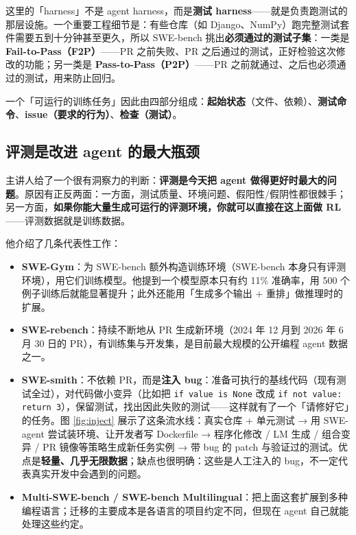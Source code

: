﻿\documentclass[a4paper]{article}
\begin{document}
这里的「harness」不是 agent harness，而是\textbf{测试 harness}——就是负责跑测试的那层设施。一个重要工程细节是：有些仓库（如 Django、NumPy）跑完整测试套件需要五到十分钟甚至更久，所以 SWE-bench 挑出\textbf{必须通过的测试子集}：一类是 \textbf{Fail-to-Pass（F2P）}——PR 之前失败、PR 之后通过的测试，正好检验这次修改的功能；另一类是 \textbf{Pass-to-Pass（P2P）}——PR 之前就通过、之后也必须通过的测试，用来防止回归。

一个「可运行的训练任务」因此由四部分组成：\textbf{起始状态}（文件、依赖）、\textbf{测试命令}、\textbf{issue（要求的行为）}、\textbf{检查（测试）}。

\subsection{评测是改进 agent 的最大瓶颈}

主讲人给了一个很有洞察力的判断：\textbf{评测是今天把 agent 做得更好时最大的问题}。原因有正反两面：一方面，测试质量、环境问题、假阳性/假阴性都很棘手；另一方面，\textbf{如果你能大量生成可运行的评测环境，你就可以直接在这上面做 RL}——评测数据就是训练数据。

他介绍了几条代表性工作：

\begin{itemize}
\item \textbf{SWE-Gym}：为 SWE-bench 额外构造训练环境（SWE-bench 本身只有评测环境），用它们训练模型。他提到一个模型原本只有约 11\% 准确率，用 500 个例子训练后就能显著提升；此外还能用「生成多个输出 + 重排」做推理时的扩展。
\item \textbf{SWE-rebench}：持续不断地从 PR 生成新环境（2024 年 12 月到 2026 年 6 月 30 日的 PR），有训练集与开发集，是目前最大规模的公开编程 agent 数据之一。
\item \textbf{SWE-smith}：不依赖 PR，而是\textbf{注入 bug}：准备可执行的基线代码（现有测试全过），对代码做小变异（比如把 \texttt{if value is None} 改成 \texttt{if not value: return 3}），保留测试，找出因此失败的测试——这样就有了一个「请修好它」的任务。图 \ref{fig:inject} 展示了这条流水线：真实仓库 + 单元测试 → 用 SWE-agent 尝试装环境、让开发者写 Dockerfile → 程序化修改 / LM 生成 / 组合变异 / PR 镜像等策略生成新任务实例 → 带 bug 的 patch 与验证过的测试。优点是\textbf{轻量、几乎无限数据}；缺点也很明确：这些是人工注入的 bug，不一定代表真实开发中会遇到的问题。
\item \textbf{Multi-SWE-bench / SWE-bench Multilingual}：把上面这套扩展到多种编程语言；迁移的主要成本是各语言的项目约定不同，但现在 agent 自己就能处理这些约定。
\end{itemize}
\end{document}
